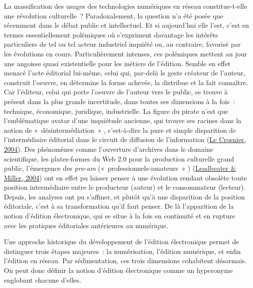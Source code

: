 \documentclass[12pt,french,letterpaper,]{article}
\newcommand{\fr}{\selectlanguage{french}}
\begin{document}
\newpage \thispagestyle{empty}
\maketitle
\fr
La massification des usages des technologies numériques en réseau
constitue-t-elle une révolution culturelle~? Paradoxalement, la question
n'a été posée que récemment dans le débat public et intellectuel. Et si
aujourd'hui elle l'est, c'est en termes essentiellement polémiques où
s'expriment davantage les intérêts particuliers de tel ou tel acteur
industriel inquiété ou, au contraire, favorisé par les évolutions en
cours. Particulièrement intenses, ces polémiques mettent au jour une
angoisse quasi existentielle pour les métiers de l'édition. Semble en
effet menacé l'acte éditorial lui-même, celui qui, par-delà le geste
créateur de l'auteur, construit l'oeuvre, en détermine la forme achevée,
la distribue et la fait connaître. Car l'éditeur, celui qui porte
l'oeuvre de l'auteur vers le public, se trouve à présent dans la plus
grande incertitude, dans toutes ses dimensions à la fois~: technique,
économique, juridique, industrielle. La figure du pirate n'est que
l'emblématique avatar d'une inquiétude ancienne, qui trouve ses racines
dans la notion de «~désintermédiation~» , c'est-à-dire la pure et simple
disparition de l'intermédiaire éditorial dans le circuit de diffusion de
l'information
(\protect\hyperlink{ref-le_crosnier_desintermediation_2004}{Le Crosnier,
2004}). Des phénomènes comme l'ouverture d'archives dans le domaine
scientifique, les plates-formes du Web 2.0 pour la production culturelle
grand public, l'émergence des \emph{pro-am} («~professionnels-amateurs~»
) (\protect\hyperlink{ref-leadbeater_pro-am_2004}{Leadbeater \& Miller,
2004}) ont en effet pu laisser penser à une évolution rendant obsolète
toute position intermédiaire entre le producteur (auteur) et le
consommateur (lecteur). Depuis, les analyses ont pu s'affiner, et plutôt
qu'à une disparition de la position éditoriale, c'est à sa
transformation qu'il faut penser. De là l'apparition de la notion
d'édition électronique, qui se situe à la fois en continuité et en
rupture avec les pratiques éditoriales antérieures au numérique.

Une approche historique du développement de l'édition électronique
permet de distinguer trois étapes majeures~: la numérisation, l'édition
numérique, et enfin l'édition en réseau. Par sédimentation, ces trois
dimensions cohabitent désormais. On peut donc définir la notion
d'édition électronique comme un hyperonyme englobant chacune d'elles.
\end{document}
